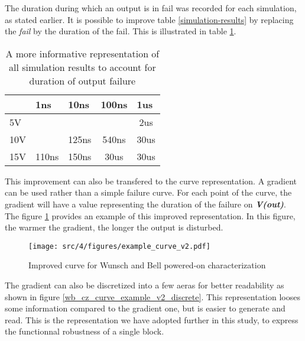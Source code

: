 The duration during which an output is in fail was recorded for each simulation, as stated earlier.
It is possible to improve table \ref{simulation-results} by replacing the \textit{fail} by the duration of the fail.
This is illustrated in table \ref{simulation-results-bis}.

\begin{table}[!h]
\centering
\begin{tabular}{@{}lcccc@{}}
\toprule
    & \multicolumn{1}{l}{1ns}      & \multicolumn{1}{l}{10ns}     & \multicolumn{1}{l}{100ns}    & \multicolumn{1}{l}{1us}     \\ \midrule
5V  & {\color[HTML]{32CB00} }      & {\color[HTML]{32CB00} }      & {\color[HTML]{32CB00} }      & {\color[HTML]{F56B00} 2us}  \\
10V & {\color[HTML]{32CB00} }      & {\color[HTML]{00D2CB} 125ns} & {\color[HTML]{F8A102} 540ns} & {\color[HTML]{FE0000} 30us} \\
15V & {\color[HTML]{00D2CB} 110ns} & {\color[HTML]{FFCB2F} 150ns} & {\color[HTML]{FE0000} 30us}  & {\color[HTML]{FE0000} 30us} \\ \bottomrule
\end{tabular}
\caption{A more informative representation of all simulation results to account for duration of output failure}
\label{simulation-results-bis}
\end{table}

This improvement can also be transfered to the curve representation.
A gradient can be used rather than a simple failure curve.
For each point of the curve, the gradient will have a value representing the duration of the failure on \textbf{\textit{V(out)}}.
The figure \ref{wb_cz_curve_example_v2} provides an example of this improved representation.
In this figure, the warmer the gradient, the longer the output is disturbed.

\begin{figure}[!h]
  \centering
  \texttt{[image: src/4/figures/example\_curve\_v2.pdf]}
  \caption{Improved curve for Wunsch and Bell powered-on characterization}
  \label{wb_cz_curve_example_v2}
\end{figure}

The gradient can also be discretized into a few aeras for better readability as shown in figure \ref{wb_cz_curve_example_v2_discrete}.
This representation looses some information compared to the gradient one, but is easier to generate and read.
This is the representation we have adopted further in this study, to express the functionnal robustness of a single block.

